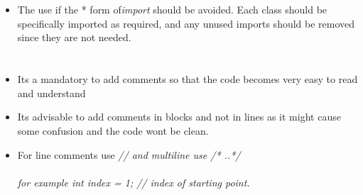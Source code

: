 \documentclass[12pt]{article}
\begin{document}
	\section{\bfseries\selectfont{Imports}}
	\begin{itemize}
		\item The use if the * form of{\it import} should be avoided. Each class should be specifically imported as required, and any unused imports should be removed since they are not needed.
		
	\end{itemize}
	
	\section{\bfseries\selectfont{General Commenting}}
	\begin{itemize}
		\item Its a mandatory to add comments so that the code becomes very easy to read and understand
		\item Its advisable to add comments in blocks and not in lines as it might cause some confusion and the code wont be clean.
		\item For line comments use {\it // and multiline use /* ..*/}\\\\
		{\it for example int index  = 1; // index of starting point.}\\\\
		
	\end{itemize}
		
\end{document}
